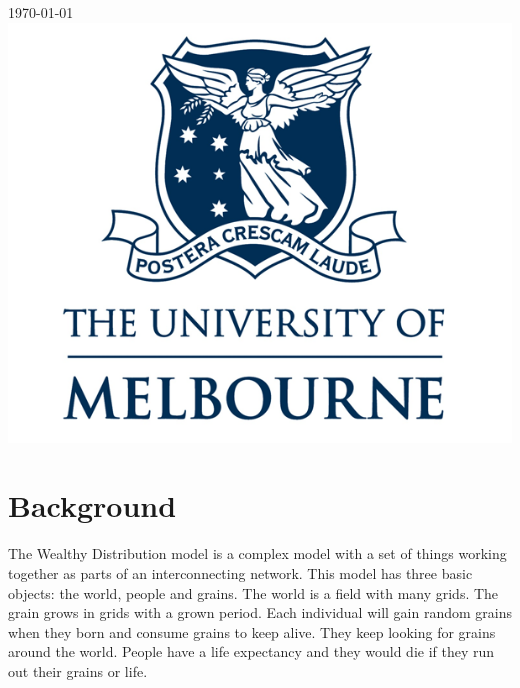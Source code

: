 \begin{titlepage}
{\large \today}\\[2cm] %


\includegraphics[scale = 0.27]{logo.png}\\[1cm] %
 

\vfill %

\end{titlepage}


\section{Background}
The Wealthy Distribution model is a complex model with a set of things working together as parts of an interconnecting network. This model has three basic objects: the world, people and grains. The world is a field with many grids. The grain grows in grids with a grown period. Each individual will gain random grains when they born and consume grains to keep alive. They keep looking for grains around the world. People have a life expectancy and they would die if they run out their grains or life.\\

